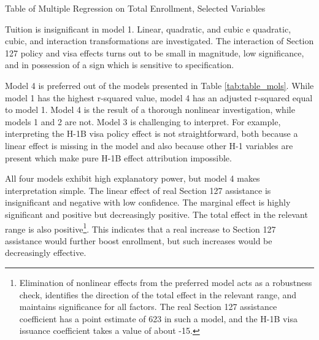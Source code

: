 \documentclass[review]{elsarticle}
\begin{document}
\begin{table}
    \caption{Table of Multiple Regression on Total Enrollment, Selected Variables}
    \resizebox{\columnwidth}{!}{
        
    }
    \label{tab:table_mols}
\end{table}

Tuition is insignificant in model 1.
Linear, quadratic, and cubic e
quadratic, cubic, and interaction transformations are investigated.
The interaction of Section 127 policy and visa effects turns out to be small in magnitude,
low significance, and in possession of a sign which is sensitive to specification.

Model 4 is preferred out of the models presented in Table \ref{tab:table_mols}.
While model 1 has the highest r-squared value,
model 4 has an adjusted r-squared equal to model 1.
Model 4 is the result of a thorough nonlinear investigation,
while models 1 and 2 are not.
Model 3 is challenging to interpret.
For example, interpreting the H-1B visa policy effect is not
straightforward, both because a linear effect is missing in the model
and also because other H-1 variables are present which make pure H-1B
effect attribution impossible.

All four models exhibit high explanatory power,
but model 4 makes interpretation simple.
The linear effect of real Section 127 assistance is insignificant and negative with low confidence.
The marginal effect is highly significant and positive but decreasingly positive.
The total effect in the relevant range is also positive\footnote{
    Elimination of nonlinear effects from the preferred model acts as a robustness check,
    identifies the direction of the total effect in the relevant range,
    and maintains significance for all factors.
    The real Section 127 assistance coefficient has a point estimate of 623 in such a model,
    and the H-1B visa issuance coefficient takes a value of about -15.
}.
This indicates that a real increase to Section 127 assistance would further boost enrollment,
but such increases would be decreasingly effective.
\end{document}
